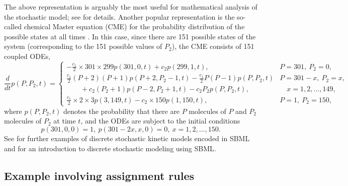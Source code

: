 The above representation is arguably the most useful for
mathematical analysis of the stochastic model; see \cite{ball:2006} for
details. Another popular representation is the so-called chemical
Master equation (CME) for the probability distribution of the possible
states at all times \citep{gillespie:1992}. In this case, since there are
151 possible states of the system (corresponding to the 151
possible values of $P_2$), the CME consists of 151 coupled
ODEs,
\[
\frac{d}{dt}p(P,P_2,t) =
\left\{
\begin{array}{ll}
\displaystyle-\frac{c_1}{2}\times 301\times 299p(301,0,t)+c_2p(299,1,t),
&P=301,\ P_2=0,\\[8pt]
\displaystyle\frac{c_1}{2}(P+2)(P+1)p(P+2,P_2-1,t)-\frac{c_1}{2}P(P-1)p(P,P_2,t)&P=301-x,\ P_2=x,\\[5pt]
\qquad+c_2(P_2+1)p(P-2,P_2+1,t)-c_2P_2p(P,P_2,t),
&\quad x=1,2,\ldots,149,\\[8pt]
\displaystyle\frac{c_1}{2}\times 2\times 3p(3,149,t)-c_2\times 150p(1,150,t),
&P=1,\ P_2=150,
\end{array}
\right.
\]
where $p(P,P_2,t)$ denotes the probability that there are $P$
molecules of $P$ and $P_2$ molecules of $P_2$ at time $t$, and the
ODEs are subject to the initial conditions
\[
p(301,0,0)=1,\ p(301-2x,x,0)=0,\ x=1,2,\ldots,150.
\]
See \cite{evans:2008} for further examples of discrete stochastic
kinetic models encoded in SBML and \cite{wilkinson_2006} for an
introduction to discrete stochastic modeling using SBML.



\subsection{Example involving assignment rules}
\label{apdx:rules-eg}

